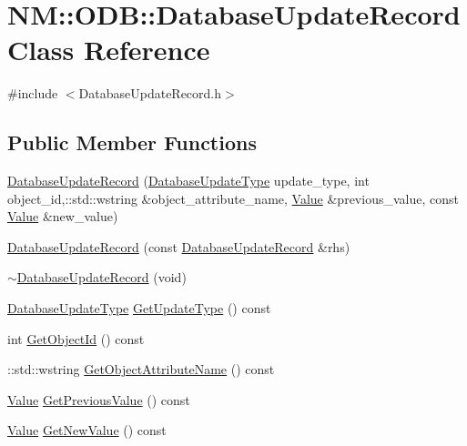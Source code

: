 \hypertarget{class_n_m_1_1_o_d_b_1_1_database_update_record}{}\section{N\+M\+:\+:O\+D\+B\+:\+:Database\+Update\+Record Class Reference}
\label{class_n_m_1_1_o_d_b_1_1_database_update_record}


{\ttfamily \#include $<$Database\+Update\+Record.\+h$>$}

\subsection*{Public Member Functions}
\begin{DoxyCompactItemize}
\item 
\hyperlink{class_n_m_1_1_o_d_b_1_1_database_update_record_a55b1eac94cc7cadc239823269c714c84}{Database\+Update\+Record} (\hyperlink{namespace_n_m_1_1_o_d_b_a66aebefa38a81f7eeb64526035e77dfa}{Database\+Update\+Type} update\+\_\+type, int object\+\_\+id,\+::std\+::wstring \&object\+\_\+attribute\+\_\+name, \hyperlink{class_n_m_1_1_o_d_b_1_1_value}{Value} \&previous\+\_\+value, const \hyperlink{class_n_m_1_1_o_d_b_1_1_value}{Value} \&new\+\_\+value)
\item 
\hyperlink{class_n_m_1_1_o_d_b_1_1_database_update_record_a6ff2323d94a1a773d9bcc503a20385df}{Database\+Update\+Record} (const \hyperlink{class_n_m_1_1_o_d_b_1_1_database_update_record}{Database\+Update\+Record} \&rhs)
\item 
\hyperlink{class_n_m_1_1_o_d_b_1_1_database_update_record_a0d02938f5938d69efe62e30ad4d20a96}{$\sim$\+Database\+Update\+Record} (void)
\item 
\hyperlink{namespace_n_m_1_1_o_d_b_a66aebefa38a81f7eeb64526035e77dfa}{Database\+Update\+Type} \hyperlink{class_n_m_1_1_o_d_b_1_1_database_update_record_aa71854661082f55b4fc99a33d90153bd}{Get\+Update\+Type} () const 
\item 
int \hyperlink{class_n_m_1_1_o_d_b_1_1_database_update_record_a256ab628138040a2603109952c624b54}{Get\+Object\+Id} () const 
\item 
\+::std\+::wstring \hyperlink{class_n_m_1_1_o_d_b_1_1_database_update_record_ab9503ddc927d5eeea471a5fc64fafc1b}{Get\+Object\+Attribute\+Name} () const 
\item 
\hyperlink{class_n_m_1_1_o_d_b_1_1_value}{Value} \hyperlink{class_n_m_1_1_o_d_b_1_1_database_update_record_a980977f382c92c61ade77f4cc0d4e91e}{Get\+Previous\+Value} () const 
\item 
\hyperlink{class_n_m_1_1_o_d_b_1_1_value}{Value} \hyperlink{class_n_m_1_1_o_d_b_1_1_database_update_record_a8bf0b685f4075df49f58aaa01866cfec}{Get\+New\+Value} () const 
\end{DoxyCompactItemize}


